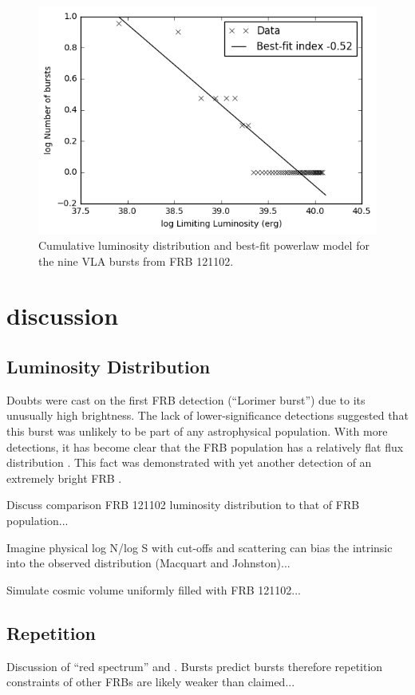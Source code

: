 \documentclass[twocolumn]{aastex61}
\newcommand{\frb}{FRB 121102}
\begin{document}
\begin{figure}[htb]
\begin{center}
\includegraphics[width=0.9\columnwidth]{luminosity_disn}
\caption{Cumulative luminosity distribution and best-fit powerlaw model for the nine VLA bursts from \frb.
\label{fig:lumd}}
\end{center}
\end{figure}

\section{discussion}

\subsection{Luminosity Distribution}
Doubts were cast on the first FRB detection (``Lorimer burst'') due to its unusually high brightness. The lack of lower-significance detections suggested that this burst was unlikely to be part of any astrophysical population. With more detections, it has become clear that the FRB population has a relatively flat flux distribution \citep{2016ApJ...830...75V, 2016arXiv161100458L}. This fact was demonstrated with yet another detection of an extremely bright FRB \citep{2016arXiv161105758R}.

Discuss comparison FRB 121102 luminosity distribution to that of FRB population...

Imagine physical log N/log S with cut-offs and scattering can bias the intrinsic into the observed distribution (Macquart and Johnston)...

Simulate cosmic volume uniformly filled with \frb...


\subsection{Repetition}
Discussion of ``red spectrum'' and \citet{2016MNRAS.458L..89C}. Bursts predict bursts therefore repetition constraints of other FRBs are likely weaker than claimed...
\end{document}
